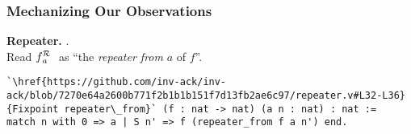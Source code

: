 \begin{frame}[fragile]
\frametitle{Mechanizing Our Observations}
%
%
%




\textbf{Repeater.} %
.
\pause \\Read $\rf{f}{a}$ \ as ``the \emph{repeater from} $a$ of $f$''.



\pause
\bigskip
\begin{lstlisting}
`\href{https://github.com/inv-ack/inv-ack/blob/7270e64a2600b771f2b1b1b151f7d13fb2ae6c97/repeater.v#L32-L36}{Fixpoint repeater\_from}` (f : nat -> nat) (a n : nat) : nat :=
match n with 0 => a | S n' => f (repeater_from f a n') end.
\end{lstlisting}


\end{frame}
